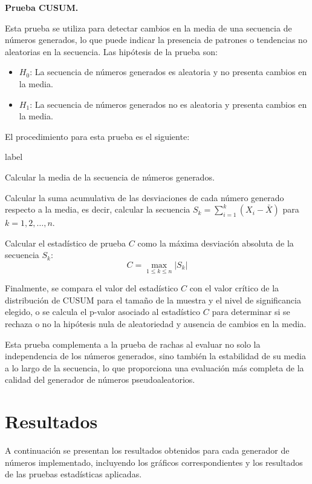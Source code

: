 \documentclass{article}
\begin{document}
\textbf{Prueba CUSUM.}

Esta prueba se utiliza para detectar cambios en la media de una secuencia de números generados, lo que puede indicar la presencia de patrones o tendencias no aleatorias en la secuencia.
Las hipótesis de la prueba son:
\begin{itemize}
  \item $H_0$: La secuencia de números generados es aleatoria y no presenta cambios en la media.
  \item $H_1$: La secuencia de números generados no es aleatoria y presenta cambios en la media.
\end{itemize}
El procedimiento para esta prueba es el siguiente:
\begin{list}{label}{}
  \item [1.] Calcular la media de la secuencia de números generados.
  \item [2.] Calcular la suma acumulativa de las desviaciones de cada número generado respecto a la media, es decir, calcular la secuencia $S_k = \sum_{i=1}^{k} (X_i - \bar{X})$ para $k = 1, 2, \dots, n$.
  \item [3.] Calcular el estadístico de prueba $C$ como la máxima desviación absoluta de la secuencia $S_k$:
        $$C = \max_{1 \leq k \leq n} |S_k|$$
\end{list}
Finalmente, se compara el valor del estadístico $C$ con el valor crítico de la distribución de CUSUM para el tamaño de la muestra y el nivel de significancia elegido, o se calcula el p-valor asociado al estadístico $C$ para determinar si se rechaza o no la hipótesis nula de aleatoriedad y ausencia de cambios en la media.

Esta prueba complementa a la prueba de rachas al evaluar no solo la independencia de los números generados, sino también la estabilidad de su media a lo largo de la secuencia, lo que proporciona una evaluación más completa de la calidad del generador de números pseudoaleatorios.

\section{Resultados}

A continuación se presentan los resultados obtenidos para cada generador de números implementado, incluyendo los gráficos correspondientes y los resultados de las pruebas estadísticas aplicadas.
\end{document}
